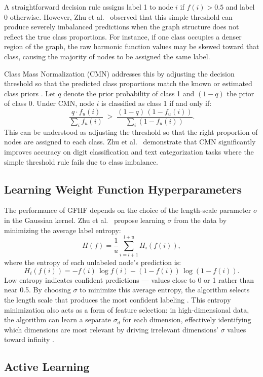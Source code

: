 \documentclass[12pt]{article}
\begin{document}
A straightforward decision rule assigns label 1 to node $i$ if $f(i) > 0.5$ and label 0 otherwise. However, Zhu et al.\ \cite{Zhu2003} observed that this simple threshold can produce severely imbalanced predictions when the graph structure does not reflect the true class proportions. For instance, if one class occupies a denser region of the graph, the raw harmonic function values may be skewed toward that class, causing the majority of nodes to be assigned the same label.

Class Mass Normalization (CMN) addresses this by adjusting the decision threshold so that the predicted class proportions match the known or estimated class priors \cite{Zhu2003}. Let $q$ denote the prior probability of class 1 and $(1-q)$ the prior of class 0. Under CMN, node $i$ is classified as class 1 if and only if:
\[
\frac{q \cdot f_u(i)}{\sum_{i} f_u(i)}
\;>\;
\frac{(1-q)\,(1 - f_u(i))}{\sum_{i} (1 - f_u(i))}.
\]
This can be understood as adjusting the threshold so that the right proportion of nodes are assigned to each class. Zhu et al.\ \cite{Zhu2003} demonstrate that CMN significantly improves accuracy on digit classification and text categorization tasks where the simple threshold rule fails due to class imbalance.

\subsection{Learning Weight Function Hyperparameters}

The performance of GFHF depends on the choice of the length-scale parameter $\sigma$ in the Gaussian kernel. Zhu et al.\ \cite{Zhu2003} propose learning $\sigma$ from the data by minimizing the average label entropy:
\[
H(f) = \frac{1}{u}\sum_{i=l+1}^{l+u} H_i(f(i)),
\]
where the entropy of each unlabeled node's prediction is:
\[
H_i(f(i)) = -f(i)\,\log f(i) - (1-f(i))\,\log(1-f(i)).
\]
Low entropy indicates confident predictions --- values close to 0 or 1 rather than near 0.5. By choosing $\sigma$ to minimize this average entropy, the algorithm selects the length scale that produces the most confident labeling \cite{Zhu2003}. This entropy minimization also acts as a form of feature selection: in high-dimensional data, the algorithm can learn a separate $\sigma_d$ for each dimension, effectively identifying which dimensions are most relevant by driving irrelevant dimensions' $\sigma$ values toward infinity \cite{Zhu2003}.

\subsection{Active Learning}
\end{document}
